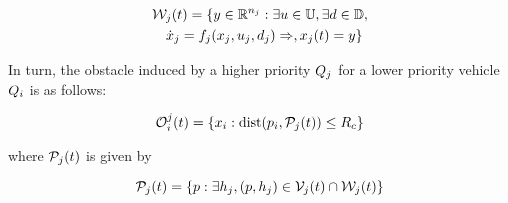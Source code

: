 \begin{equation}
\label{eq:frs2}
\begin{aligned}
&\mathcal{W}_j(t) = \{y \in \mathbb{R}^{n_j}: \exists u \in \mathbb{U}, \exists d \in \mathbb{D}, \\
& \quad \dot{x}_j = f_j(x_j, u_j, d_j) \Rightarrow, x_j(t) = y\}
\end{aligned}
\end{equation}

In turn, the obstacle induced by a higher priority $Q_j$ for a lower priority vehicle $Q_i$ is as follows:

\begin{equation}
\mathcal{O}_i^j(t) = \{x_i: \text{dist}(p_i, \mathcal{P}_j(t)) \le R_c \}
\end{equation}

\noindent where $\mathcal{P}_j(t)$ is given by

\begin{equation}
\mathcal{P}_j(t) = \{p: \exists h_j, (p, h_j) \in \mathcal{V}_j(t) \cap \mathcal{W}_j(t)\}
\end{equation}